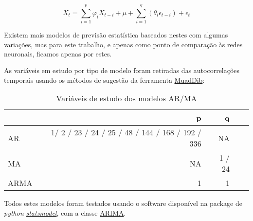 \begin{equation} \label{eq:arma} 
    X_{t} = \sum_{i=1}^{p}\varphi_{i} X_{t-i}  + \mu + \sum_{i=1}^{q}(\theta_{i} \epsilon_{t-i}) + \epsilon_{t}
\end{equation}
\smallskip

Existem mais modelos de previsão estatística baseados nestes com algumas variações, mas para este trabalho, e apenas como ponto de comparação às redes neuronais, ficamos apenas por estes.\par
As variáveis em estudo por tipo de modelo foram retiradas das autocorrelações temporais usando os métodos de sugestão da ferramenta \hyperref[se:muaddib]{MuadDib}:\\


\begin{table}[h] \centering
\begin{tabular}{lrrrr}
    \toprule
     & p & q \\
    \midrule
    \gls{AR} & 1/ 2 / 23 / 24 / 25 / 48 / 144 / 168 / 192 / 336 & NA \\
    \gls{MA} & NA & 1 / 24 \\
    \gls{ARMA} & 1 & 1 \\
    \bottomrule
    \end{tabular}
    \label{tab:varsstats} 
    \caption{Variáveis de estudo dos modelos AR/MA}
\end{table}


Todos estes modelos foram testados usando o software disponível na package de \textit{python} \href{https://www.statsmodels.org/stable/index.html}{\textit{statsmodel}}, com a classe \href{https://www.statsmodels.org/stable/generated/statsmodels.tsa.arima.model.ARIMA.html}{ARIMA}.
